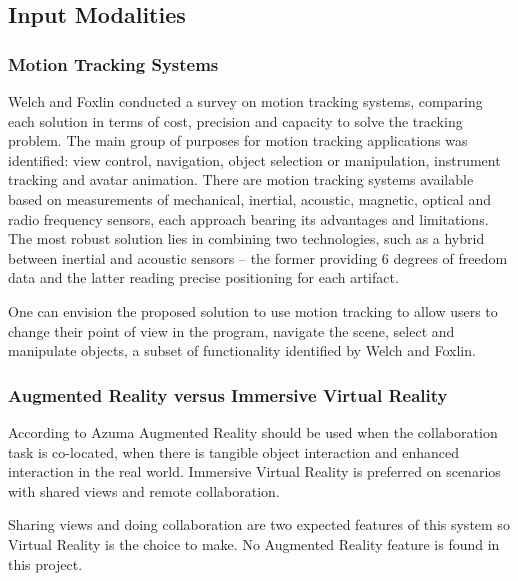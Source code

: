 \subsection{Input Modalities}

\subsubsection{Motion Tracking Systems}


Welch and Foxlin \cite{MT-BULLET} conducted a survey on motion tracking systems,
comparing each solution in terms of cost, precision and capacity to solve the tracking problem.
The main group of purposes for motion tracking applications was identified:
view control, navigation, object selection or manipulation, instrument tracking and avatar animation.
There are motion tracking systems available based on measurements of mechanical, inertial, acoustic, magnetic,
optical and radio frequency sensors, each approach bearing its advantages and limitations.
The most robust solution lies in combining two technologies,
such as a hybrid between inertial and acoustic sensors
-- the former providing 6 degrees of freedom data and the latter reading precise positioning for each artifact.



One can envision the proposed solution to use motion tracking to allow users to change their
point of view in the program, navigate the scene, select and manipulate objects, a subset
of functionality identified by Welch and Foxlin.

\subsubsection{Augmented Reality versus Immersive Virtual Reality}

According to Azuma \cite{OVERVIEW-AR} Augmented Reality should be used
when the collaboration task is co-located,
when there is tangible object interaction and enhanced interaction in the real world.
Immersive Virtual Reality is preferred on scenarios with shared views and
remote collaboration.


Sharing views and doing collaboration are two expected features of this system so
Virtual Reality is the choice to make. No Augmented Reality feature is found in this project.


%
